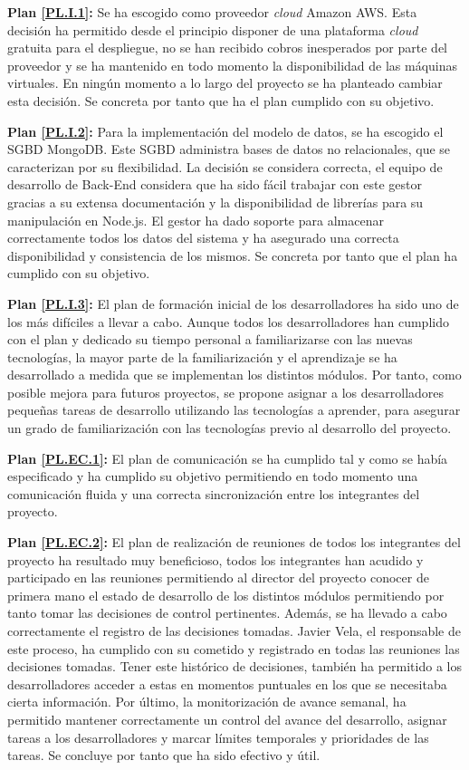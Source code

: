 \documentclass{article}
\begin{document}
\textbf{Plan \ref{PL.I.1}:}
Se ha escogido como proveedor \textit{cloud} Amazon AWS. Esta decisión ha permitido desde el principio disponer de una plataforma \textit{cloud} gratuita para el despliegue, no se han recibido cobros inesperados por parte del proveedor y se ha mantenido en todo momento la disponibilidad de las máquinas virtuales. En ningún momento a lo largo del proyecto se ha planteado cambiar esta decisión. Se concreta por tanto que ha el plan cumplido con su objetivo.

\textbf{Plan \ref{PL.I.2}:}
Para la implementación del modelo de datos, se ha escogido el SGBD MongoDB. Este SGBD administra bases de datos no relacionales, que se caracterizan por su flexibilidad. La decisión se considera correcta, el equipo de desarrollo de Back-End considera que ha sido fácil trabajar con este gestor gracias a su extensa documentación y la disponibilidad de librerías para su manipulación en Node.js. El gestor ha dado soporte para almacenar correctamente todos los datos del sistema y ha asegurado una correcta disponibilidad y consistencia de los mismos. Se concreta por tanto que el plan ha cumplido con su objetivo.

\textbf{Plan \ref{PL.I.3}:}
El plan de formación inicial de los desarrolladores ha sido uno de los más difíciles a llevar a cabo. Aunque todos los desarrolladores han cumplido con el plan y dedicado su tiempo personal a familiarizarse con las nuevas tecnologías, la mayor parte de la familiarización y el aprendizaje se ha desarrollado a medida que se implementan los distintos módulos. Por tanto, como posible mejora para futuros proyectos, se propone asignar a los desarrolladores pequeñas tareas de desarrollo utilizando las tecnologías a aprender, para asegurar un grado de familiarización con las tecnologías previo al desarrollo del proyecto.

\textbf{Plan \ref{PL.EC.1}:}
El plan de comunicación se ha cumplido tal y como se había especificado y ha cumplido su objetivo permitiendo en todo momento una comunicación fluida y una correcta sincronización entre los integrantes del proyecto.

\textbf{Plan \ref{PL.EC.2}:}
El plan de realización de reuniones de todos los integrantes del proyecto ha resultado muy beneficioso, todos los integrantes han acudido y participado en las reuniones permitiendo al director del proyecto conocer de primera mano el estado de desarrollo de los distintos módulos permitiendo por tanto tomar las decisiones de control pertinentes.
Además, se ha llevado a cabo correctamente el registro de las decisiones tomadas. Javier Vela, el responsable de este proceso, ha cumplido con su cometido y registrado en todas las reuniones las decisiones tomadas. Tener este histórico de decisiones, también ha permitido a los desarrolladores acceder a estas en momentos puntuales en los que se necesitaba cierta información. Por último, la monitorización de avance semanal, ha permitido mantener correctamente un control del avance del desarrollo, asignar tareas a los desarrolladores y marcar límites temporales y prioridades de las tareas. Se concluye por tanto que ha sido efectivo y útil.
\end{document}
